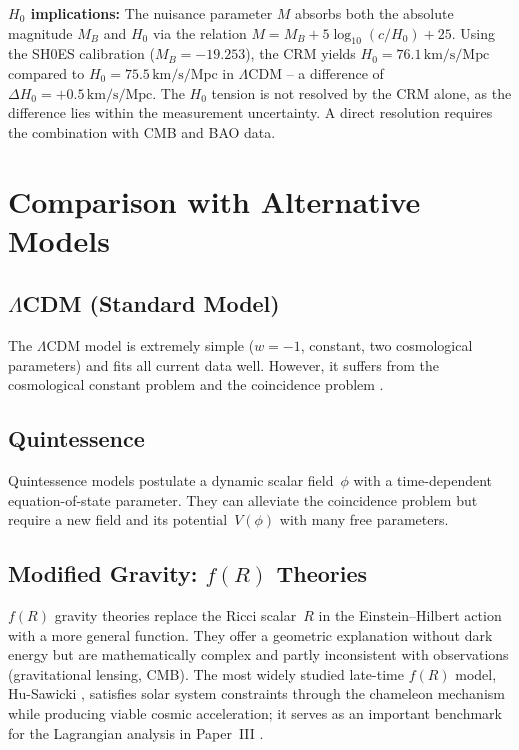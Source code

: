 \documentclass[aps,prd,twocolumn,superscriptaddress,nofootinbib]{revtex4-2}
\begin{document}
\textbf{$H_0$ implications:} The nuisance parameter $M$ absorbs both the absolute magnitude $M_B$ and $H_0$ via the relation $M = M_B + 5\log_{10}(c/H_0) + 25$. Using the SH0ES calibration ($M_B = -19.253$), the CRM yields $H_0 = 76.1\,\mathrm{km/s/Mpc}$ compared to $H_0 = 75.5\,\mathrm{km/s/Mpc}$ in $\Lambda$CDM -- a difference of $\Delta H_0 = +0.5\,\mathrm{km/s/Mpc}$. The $H_0$ tension is not resolved by the CRM alone, as the difference lies within the measurement uncertainty. A direct resolution requires the combination with CMB and BAO data.


\section{Comparison with Alternative Models}
\label{sec:alternatives}

\subsection{$\Lambda$CDM (Standard Model)}

The $\Lambda$CDM model is extremely simple ($w = -1$, constant, two cosmological parameters) and fits all current data well. However, it suffers from the cosmological constant problem and the coincidence problem \cite{Weinberg1989}.

\subsection{Quintessence}

Quintessence models \cite{Caldwell1998} postulate a dynamic scalar field~$\phi$ with a time-dependent equation-of-state parameter. They can alleviate the coincidence problem but require a new field and its potential~$V(\phi)$ with many free parameters.

\subsection{Modified Gravity: $f(R)$ Theories}

$f(R)$ gravity theories \cite{Starobinsky1980, Sotiriou2010} replace the Ricci scalar~$R$ in the Einstein--Hilbert action with a more general function. They offer a geometric explanation without dark energy but are mathematically complex and partly inconsistent with observations (gravitational lensing, CMB). The most widely studied late-time $f(R)$ model, Hu-Sawicki \cite{HuSawicki2007}, satisfies solar system constraints through the chameleon mechanism while producing viable cosmic acceleration; it serves as an important benchmark for the Lagrangian analysis in Paper~III \cite{Geiger2026c}.
\end{document}
